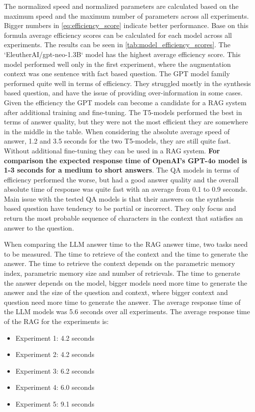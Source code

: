 \documentclass{wseas}
\begin{document}
The normalized speed and normalized parameters are calculated based on the maximum speed and the maximum number of parameters across all experiments.
Bigger numbers in \autoref{eq:efficiency_score} indicate better performance. Base on this formula average efficiency scores can be calculated for each model across all experiments. 
The results can be seen in \autoref{tab:model_efficiency_scores}. The `EleutherAI/gpt-neo-1.3B` model has the highest average efficiency score. 
This model performed well only in the first experiment, where the augmentation context was one sentence with fact based question.
The GPT model family performed quite well in terms of efficiency. They struggled mostly in the synthesis based question, and have the issue of providing
over-information in some cases. Given the efficiency the GPT models can become a candidate for a RAG system after additional training and fine-tuning.
The T5-models performed the best in terms of answer quality, but they were not the most efficient they are somewhere in the middle in the table. 
When considering the absolute average speed of answer, 1.2 and 3.5 seconds for the two T5-models, they are still quite fast. Without additional fine-tuning
they can be used in a RAG system. \textbf{For comparison the expected response time of OpenAI's GPT-4o model is 1-3 seconds for a medium to short answers}.
The QA models in terms of efficiency performed the worse, but had a good answer quality and the overall absolute time of response was quite fast with an 
average from 0.1 to 0.9 seconds. Main issue with the tested QA models is that their answers on the synthesis based question
have tendency to be partial or incorrect. They only focus and return the most probable sequence of characters in the context that satisfies an answer to the question. 

When comparing the LLM answer time to the RAG answer time, two tasks need to be measured. The time to retrieve of the context and the time to generate the answer.
The time to retrieve the context depends on the parametric memory index, parametric memory size and number of retrievals. 
The time to generate the answer depends on the model, bigger models need more time to generate the answer and the size of the question and context, 
where bigger context and question need more time to generate the answer. The average response time of the LLM models was 5.6 seconds over all experiments.
The average response time of the RAG for the experiments is:
\begin{itemize}
  \item Experiment 1: 4.2 seconds
  \item Experiment 2: 4.2 seconds
  \item Experiment 3: 6.2 seconds
  \item Experiment 4: 6.0 seconds
  \item Experiment 5: 9.1 seconds
\end{itemize}
\end{document}
